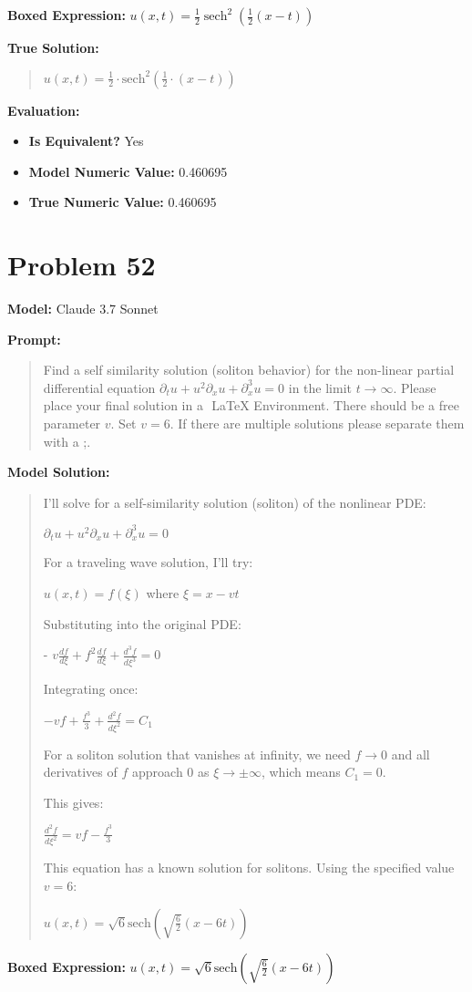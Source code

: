\documentclass{article}
\begin{document}
\textbf{Boxed Expression:} $u(x,t) = \frac{1}{2}\operatorname{sech}^2\left(\frac{1}{2}(x-t)\right)$

\textbf{True Solution:}
\begin{quote}
$u(x,t) = \frac{1}{2}\cdot\text{sech}^2\left(\frac{1}{2}\cdot(x - t)\right)$
\end{quote}

\textbf{Evaluation:}
\begin{itemize}
\item \textbf{Is Equivalent?} Yes
\item \textbf{Model Numeric Value:} 0.460695
\item \textbf{True Numeric Value:} 0.460695
\end{itemize}
\vspace{1cm}
\section*{Problem 52}
\textbf{Model:} Claude 3.7 Sonnet

\textbf{Prompt:}
\begin{quote}
Find a self similarity solution (soliton behavior) for the non-linear partial differential equation $ \partial_t u + u^2 \partial_x u + \partial_x^3 u = 0 $ in the limit $t\to\infty$. Please place your final solution in a $\boxed{}$ LaTeX Environment. There should be a free parameter $v$. Set $v=6$. If there are multiple solutions please separate them with a ;.
\end{quote}
\textbf{Model Solution:}
\begin{quote}
I'll solve for a self-similarity solution (soliton) of the nonlinear PDE:



$\partial_t u + u^2 \partial_x u + \partial_x^3 u = 0$



For a traveling wave solution, I'll try:

$u(x,t) = f(ξ)$ where $ξ = x - vt$



Substituting into the original PDE:

- $v \frac{df}{dξ} + f^2 \frac{df}{dξ} + \frac{d^3f}{dξ^3} = 0$



Integrating once:

$-vf + \frac{f^3}{3} + \frac{d^2f}{dξ^2} = C_1$



For a soliton solution that vanishes at infinity, we need $f→0$ and all derivatives of $f$ approach 0 as $ξ→±∞$, which means $C_1 = 0$.



This gives:

$\frac{d^2f}{dξ^2} = vf - \frac{f^3}{3}$



This equation has a known solution for solitons. Using the specified value $v = 6$:



$\boxed{u(x,t) = \sqrt{6} \text{sech}(\sqrt{\frac{6}{2}}(x-6t))}$
\end{quote}
\textbf{Boxed Expression:} $u(x,t) = \sqrt{6} \text{sech}(\sqrt{\frac{6}{2}}(x-6t))$
\end{document}
